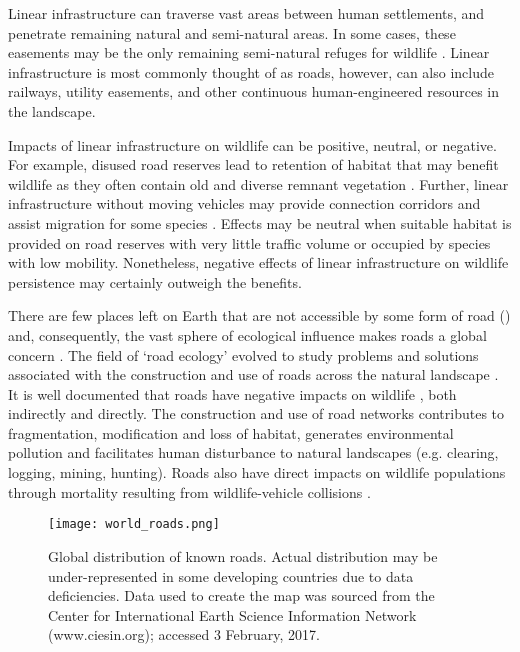 Linear infrastructure can traverse vast areas between human settlements, and penetrate remaining natural and semi-natural areas. In some cases, these easements may be the only remaining semi-natural refuges for wildlife \citep{benn91}. Linear infrastructure is most commonly thought of as roads, however, can also include railways, utility easements, and other continuous human-engineered resources in the landscape.

Impacts of linear infrastructure on wildlife can be positive, neutral, or negative. For example, disused road reserves lead to retention of habitat that may benefit wildlife as they often contain old and diverse remnant vegetation \citep{lent11}. Further, linear infrastructure without moving vehicles may provide connection corridors and assist migration for some species \citep{rvdr15}. Effects may be neutral when suitable habitat is provided on road reserves with very little traffic volume or occupied by species with low mobility. Nonetheless, negative effects of linear infrastructure on wildlife persistence may certainly outweigh the benefits.

There are few places left on Earth that are not accessible by some form of road () and, consequently, the vast sphere of ecological influence makes roads a global concern \citep{laur14}. The field of `road ecology' evolved to study problems and solutions associated with the construction and use of roads across the natural landscape \citep[see][]{form03}. It is well documented that roads have negative impacts on wildlife \citep{form98,spel98,rvdr15}, both indirectly and directly. The construction and use of road networks contributes to fragmentation, modification and loss of habitat, generates environmental pollution and facilitates human disturbance to natural landscapes (e.g. clearing, logging, mining, hunting). Roads also have direct impacts on wildlife populations through mortality resulting from wildlife-vehicle collisions \citep{fahr09}.

\begin{figure*}[!t]
  \centering
  \texttt{[image: world\_roads.png]}
  \caption[Global distribution of known roads]{Global distribution of known roads. Actual distribution may be under-represented in some developing countries due to data deficiencies. Data used to create the map was sourced from the Center for International Earth Science Information Network (www.ciesin.org); accessed 3 February, 2017.}
  \label{roads}
\end{figure*}


